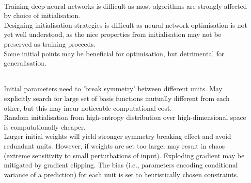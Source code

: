 \begin{remark} \\
Training deep neural networks is difficult as most algorithms are strongly affected by choice of initialisation.\\
Designing initialisation strategies is difficult as neural network optimisation is not yet well understood, as the nice properties from initialisation may not be preserved as training proceeds.\\
Some initial points may be beneficial for optimisation, but detrimental for generalisation.
\end{remark}

\begin{remark} \\
Initial parameters need to 'break symmetry' between different units. May explicitly search for large set of basis functions mutually different from each other, but this may incur noticeable computational cost.\\
Random initialisation from high-entropy distribution over high-dimensional space is computationally cheaper.\\
Larger initial weights will yield stronger symmetry breaking effect and avoid redundant units. However, if weights are set too large, may result in chaos (extreme sensitivity to small perturbations of input). Exploding gradient may be mitigated by gradient clipping. The bias (i.e., parameters encoding conditional variance of a prediction) for each unit is set to heuristically chosen constraints.
\end{remark}

